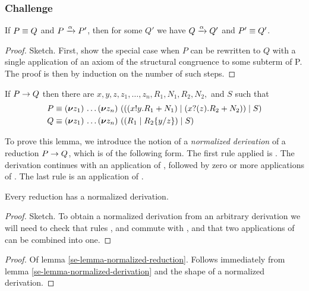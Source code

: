 \subsubsection{Challenge}
\begin{lemma}\label{se-lemma-harmony-fact}
  If \( P \equiv Q \) and \( P \xrightarrow{\alpha} P' \), then for some \( Q' \) we have \( Q \xrightarrow{\alpha} Q' \) and \( P' \equiv Q' \).
\end{lemma}
\begin{proof}
  Sketch. First, show the special case when \( P \) can be rewritten to \( Q \) with a single application of an axiom of the structural congruence to some subterm of P.
  The proof is then by induction on the number of such steps.
\end{proof}

\begin{lemma}\label{se-lemma-normalized-reduction}
  If \( P \rightarrow Q \) then there are \( x, y, z, z_1, \dots, z_n, R_1, N_1, R_2, N_2, \) and \( S\) such that
  \begin{align*}
    &P \equiv (\bm{\nu} z_1)~\!\dots (\bm{\nu} z_n)~(((x ! y . R_1 + N_1) \mid (x ? (z) . R_2 + N_2)) \mid S) \\
    &Q \equiv (\bm{\nu} z_1)~\!\dots (\bm{\nu} z_n)~((R_1 \mid R_2\{y/z\}) \mid S)
  \end{align*}
\end{lemma}
To prove this lemma, we introduce the notion of a \emph{normalized derivation} of a reduction \( P \rightarrow Q \), which is of the following form.
The first rule applied is . The derivation continues with an application of , followed by zero or more applications of .
The last rule is an application of .
\begin{lemma}\label{se-lemma-normalized-derivation}
  Every reduction has a normalized derivation.
\end{lemma}
\begin{proof}
  Sketch. To obtain a normalized derivation from an arbitrary derivation we will need to check that rules ,  and  commute with , and that two applications of  can be combined into one.
\end{proof}
\begin{proof}{Of lemma \autoref{se-lemma-normalized-reduction}.}
  Follows immediately from lemma \autoref{se-lemma-normalized-derivation} and the shape of a normalized derivation.
\end{proof}

